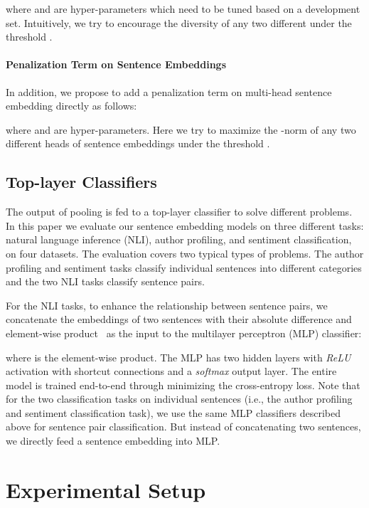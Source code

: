 \documentclass[11pt]{article}
\begin{document}
\noindent where  and  are hyper-parameters which need to be tuned based on a development set. Intuitively, we try to encourage the  diversity of any two different  under the threshold . 

\paragraph{Penalization Term on Sentence Embeddings}
In addition, we propose to add a penalization term on multi-head sentence embedding  directly as follows:


\noindent where  and  are hyper-parameters. Here we try to maximize the -norm of any two different heads of sentence embeddings under the threshold .

\subsection{Top-layer Classifiers}

The output of pooling is fed to a top-layer classifier to solve different problems. In this paper we evaluate our sentence embedding models on three different tasks: natural language
inference (NLI), author profiling, and sentiment classification, on four datasets. The evaluation covers two typical types of problems. The author profiling and sentiment tasks classify individual sentences into different categories and the two NLI tasks classify sentence pairs. 

For the NLI tasks, to enhance the relationship between sentence pairs, we concatenate the embeddings of two sentences with their absolute difference and element-wise product~\cite{DBLP:conf/acl/MouMLX0YJ16} as the input to the multilayer perceptron (MLP) classifier:



\noindent where  is the element-wise product. The MLP has two hidden layers with \textit{ReLU} activation with shortcut connections and a \textit{softmax} output layer. The entire model is trained end-to-end through minimizing the cross-entropy loss. Note that for the two classification tasks on individual sentences (i.e., the author profiling and sentiment classification task), we use the same MLP classifiers described above for sentence pair classification. But instead of concatenating two sentences, we directly feed a sentence embedding into MLP.

\section{Experimental Setup}
\label{sec:setup}
\end{document}

